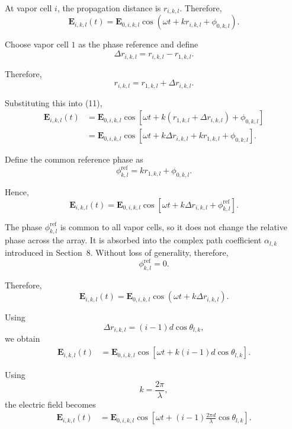 \documentclass[12pt,a4paper]{article}
\begin{document}
At vapor cell \(i\), the propagation distance is
\(r_{i,k,l}\). Therefore,
\begin{equation}
\mathbf E_{i,k,l}(t)
=
\mathbf E_{0,i,k,l}
\cos
\left(
\omega t
+
kr_{i,k,l}
+
\phi_{0,k,l}
\right).
\tag{11}
\end{equation}

Choose vapor cell \(1\) as the phase reference and define
\[
\Delta r_{i,k,l}
=
r_{i,k,l}-r_{1,k,l}.
\]

Therefore,
\[
r_{i,k,l}
=
r_{1,k,l}
+
\Delta r_{i,k,l}.
\]

Substituting this into (11),
\[
\begin{aligned}
\mathbf E_{i,k,l}(t)
&=
\mathbf E_{0,i,k,l}
\cos
\left[
\omega t
+
k
\left(
r_{1,k,l}+\Delta r_{i,k,l}
\right)
+
\phi_{0,k,l}
\right]\\
&=
\mathbf E_{0,i,k,l}
\cos
\left[
\omega t
+
k\Delta r_{i,k,l}
+
kr_{1,k,l}
+
\phi_{0,k,l}
\right].
\end{aligned}
\]

Define the common reference phase as
\[
\phi_{k,l}^{\mathrm{ref}}
=
kr_{1,k,l}
+
\phi_{0,k,l}.
\]

Hence,
\[
\mathbf E_{i,k,l}(t)
=
\mathbf E_{0,i,k,l}
\cos
\left[
\omega t
+
k\Delta r_{i,k,l}
+
\phi_{k,l}^{\mathrm{ref}}
\right].
\]

The phase \(\phi_{k,l}^{\mathrm{ref}}\) is common to all vapor cells, so it does not
change the relative phase across the array. It is absorbed into the complex
path coefficient \(\alpha_{l,k}\) introduced in Section~8. Without loss of
generality, therefore,
\[
\phi_{k,l}^{\mathrm{ref}}=0.
\]

Therefore,
\begin{equation}
\mathbf E_{i,k,l}(t)
=
\mathbf E_{0,i,k,l}
\cos
\left(
\omega t+k\Delta r_{i,k,l}
\right).
\tag{12}
\end{equation}

Using
\[
\Delta r_{i,k,l}
=
(i-1)d\cos\theta_{l,k},
\]
we obtain
\[
\begin{aligned}
\mathbf E_{i,k,l}(t)
&=
\mathbf E_{0,i,k,l}
\cos
\left[
\omega t
+
k(i-1)d\cos\theta_{l,k}
\right].
\end{aligned}
\]



Using
\[
k=\frac{2\pi}{\lambda},
\]
the electric field becomes
\[
\begin{aligned}
\mathbf E_{i,k,l}(t)
&=
\mathbf E_{0,i,k,l}
\cos
\left[
\omega t
+
(i-1)
\frac{2\pi d}{\lambda}
\cos\theta_{l,k}
\right].
\end{aligned}
\]
\end{document}
